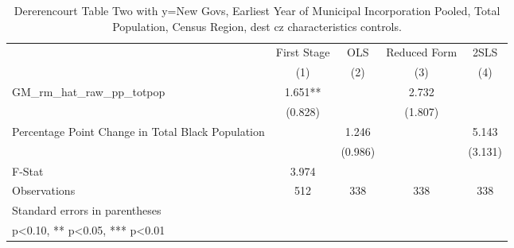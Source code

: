 \begin{table}[htbp]\centering
\def\sym#1{\ifmmode^{#1}\else\(^{#1}\)\fi}
\caption{Dererencourt Table Two with y=New Govs, Earliest Year of Municipal Incorporation  Pooled, Total Population, Census Region, dest cz characteristics controls.}
\begin{tabular}{l*{4}{c}}
\toprule
                    & First Stage   &         OLS   &Reduced Form   &        2SLS   \\
                    &\multicolumn{1}{c}{(1)}   &\multicolumn{1}{c}{(2)}   &\multicolumn{1}{c}{(3)}   &\multicolumn{1}{c}{(4)}   \\
\midrule
GM\_rm\_hat\_raw\_pp\_totpop&       1.651** &               &       2.732   &               \\
                    &     (0.828)   &               &     (1.807)   &               \\
\addlinespace
Percentage Point Change in Total Black Population&               &       1.246   &               &       5.143   \\
                    &               &     (0.986)   &               &     (3.131)   \\
\midrule
F-Stat              &       3.974   &               &               &               \\
Observations        &         512   &         338   &         338   &         338   \\
\bottomrule
\multicolumn{5}{l}{\footnotesize Standard errors in parentheses}\\
\multicolumn{5}{l}{\footnotesize * p<0.10, ** p<0.05, *** p<0.01}\\
\end{tabular}
\end{table}
